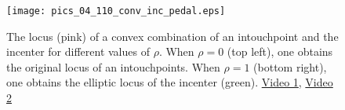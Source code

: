 \begin{figure}
    \centering
    \texttt{[image: pics\_04\_110\_conv\_inc\_pedal.eps]}
    \caption{The locus (pink) of a convex combination of an intouchpoint and the incenter for different values of $\rho$. When $\rho=0$ (top left), one obtains the original locus of an intouchpoints. When $\rho=1$ (bottom right), one obtains the elliptic locus of the incenter (green). \href{https://youtu.be/3Gr3Nh5-jHs}{Video 1}, \href{https://youtu.be/HZFjkWD_CnE}{Video 2}}
    \label{fig:04-inc-wind3}
\end{figure}




